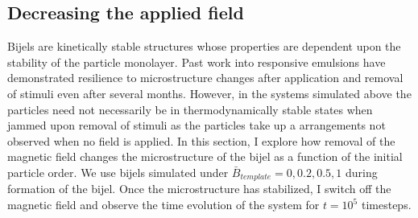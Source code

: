 \subsection{Decreasing the applied
field}\label{decreasing-the-applied-field}

Bijels are kinetically stable structures whose properties are dependent
upon the stability of the particle monolayer. Past work into responsive
emulsions have demonstrated resilience to microstructure changes after
application and removal of stimuli even after several months. \cite{cui_stabilizing_2013} However,
in the systems simulated above the particles need not necessarily be in
thermodynamically stable states when jammed upon removal of stimuli as
the particles take up a arrangements not observed when no field is
applied. In this section, I explore how removal of the magnetic field
changes the microstructure of the bijel as a function of the initial
particle order. We use bijels simulated under
$\bar{B}_{template} = 0, 0.2, 0.5, 1$ during formation of the bijel. Once
the microstructure has stabilized, I switch off the magnetic field and
observe the time evolution of the system for $t = 10^5$ timesteps.

